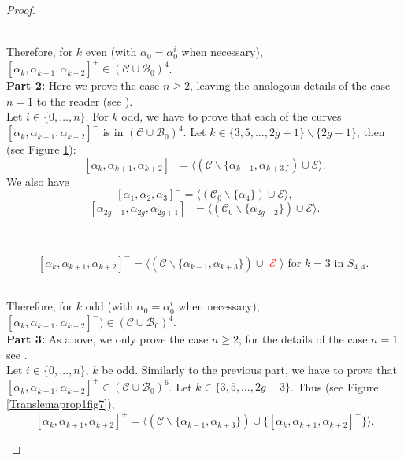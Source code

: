 \documentclass[twoside,11pt,a4paper]{article}
\newcommand*{\Cf}{\mathscr{C}}
\newcommand*{\Bf}{\mathscr{B}}
\newcommand*{\Ef}{\mathscr{E}}
\begin{document}
\begin{proof}
\begin{figure}[h]
\begin{center}
 \end{center}
\end{figure}\\
\indent Therefore, for $k$ even (with $\alpha_{0} = \alpha_{0}^{i}$ when necessary), $[\alpha_{k}, \alpha_{k+1}, \alpha_{k+2}]^{\pm} \in (\Cf \cup \Bf_{0})^{4}$.\\
\textbf{Part 2:} Here we prove the case $n \geq 2$, leaving the analogous details of the case $n = 1$ to the reader (see \cite{Thesis}).\\
\indent Let $i \in \{0, \ldots, n\}$. For $k$ odd, we have to prove that each of the curves $[\alpha_{k}, \alpha_{k+1}, \alpha_{k+2}]^{-}$ is in $(\Cf \cup \Bf_{0})^{4}$. Let $k \in \{3, 5, \ldots, 2g+1\} \backslash \{2g-1\}$, then (see Figure \ref{Translemaprop1fig5}): $$[\alpha_{k},\alpha_{k+1},\alpha_{k+2}]^{-} = \langle (\Cf \backslash \{\alpha_{k-1}, \alpha_{k+3}\}) \cup \Ef\rangle.$$
\indent We also have $$[\alpha_{1}, \alpha_{2}, \alpha_{3}]^{-} = \langle (\Cf_{0} \backslash \{\alpha_{4}\}) \cup \Ef\rangle,$$ $$[\alpha_{2g-1}, \alpha_{2g}, \alpha_{2g+1}]^{-} = \langle (\Cf_{0} \backslash \{\alpha_{2g-2}\}) \cup \Ef\rangle.$$
\begin{figure}[h]
 \begin{center}
  \resizebox{10cm}{!}{} \\[0.3cm]
  \resizebox{10cm}{!}{} \caption{$[\alpha_{k},\alpha_{k+1},\alpha_{k+2}]^{-} = \langle (\Cf \backslash \{\alpha_{k-1}, \alpha_{k+3}\}) \cup$ \textcolor{red}{$\Ef$} $\rangle$ for $k = 3$ in $S_{4,4}$.}\label{Translemaprop1fig5}
 \end{center}
\end{figure}\\
\indent Therefore, for $k$ odd (with $\alpha_{0} = \alpha_{0}^{i}$ when necessary), $[\alpha_{k}, \alpha_{k+1}, \alpha_{k+2}]^{-}) \in (\Cf \cup \Bf_{0})^{4}$.\\
\textbf{Part 3:} As above, we only prove the case $n \geq 2$; for the details of the case $n = 1$ see \cite{Thesis}.\\
\indent Let $i \in \{0, \ldots, n\}$, $k$ be odd. Similarly to the previous part, we have to prove that $[\alpha_{k}, \alpha_{k+1}, \alpha_{k+2}]^{+} \in (\Cf \cup \Bf_{0})^{6}$. Let $k \in \{3, 5, \ldots, 2g-3\}$. Thus (see Figure \ref{Translemaprop1fig7}), $$[\alpha_{k},\alpha_{k+1},\alpha_{k+2}]^{+} = \langle (\Cf \backslash \{\alpha_{k-1},\alpha_{k+3}\}) \cup \{[\alpha_{k},\alpha_{k+1},\alpha_{k+2}]^{-}\}\rangle.$$
\begin{figure}[h]

\end{figure}
\end{proof}
\end{document}
